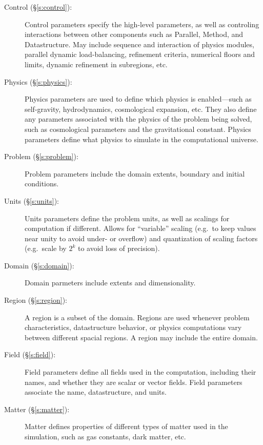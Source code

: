 \documentclass{book}
\begin{document}
\begin{description}

 \item [Control (\S\ref{s:control}): ] Control parameters specify the
 high-level parameters, as well as controling interactions between
 other components such as Parallel, Method, and Datastructure.  May
 include sequence and interaction of physics modules, parallel dynamic
 load-balancing, refinement criteria, numerical floors and limits,
 dynamic refinement in subregions, etc.

 \item [Physics (\S\ref{s:physics}): ] Physics parameters are used to
 define which physics is enabled---such as self-gravity,
 hydrodynamics, cosmological expansion, etc.  They also define any
 parameters associated with the physics of the problem being solved,
 such as cosmological parameters and the gravitational constant.
 Physics parameters define what physics to simulate in the
 computational universe.

 \item [Problem (\S\ref{s:problem}): ] Problem parameters include
 the domain extents, boundary and initial conditions.

 \item [Units (\S\ref{s:units}): ] Units parameters define the problem
 units, as well as scalings for computation if different.  Allows for
 ``variable'' scaling (e.g.~to keep values near unity to avoid under-
 or overflow) and quantization of scaling factors (e.g.~scale by $2^k$
 to avoid loss of precision).

 \item [Domain (\S\ref{s:domain}): ] Domain parmeters include extents
 and dimensionality.

 \item [Region (\S\ref{s:region}): ] A region is a subset of the
 domain.  Regions are used whenever problem characteristics,
 datastructure behavior, or physics computations vary between
 different spacial regions.  A region may include the entire
 domain.

 \item [Field (\S\ref{s:field}): ] Field parameters define all fields
 used in the computation, including their names, and whether they are
 scalar or vector fields.  Field parameters associate the name,
 datastructure, and units.

 \item [Matter (\S\ref{s:matter}): ] Matter defines properties of
 different types of matter used in the simulation, such as gas
 constants, dark matter, etc.


\end{description}
\end{document}
